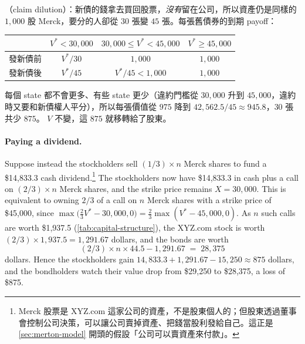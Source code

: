 \begin{remark}
	（claim dilution）：新債的錢拿去買回股票，\emph{沒有}留在公司，所以資產仍是同樣的 $1{,}000$ 股 Merck，要分的人卻從 $30$ 張變 $45$ 張。每張舊債券的到期 payoff：
	\begin{center}
		\begin{tabular}{lccc}
			\toprule
			   & $V^{*}<30{,}000$ & $30{,}000\le V^{*}<45{,}000$ & $V^{*}\ge45{,}000$ \\
			\midrule
			發新債前 & $V^{*}/30$       & $1{,}000$                    & $1{,}000$          \\
			發新債後 & $V^{*}/45$       & $V^{*}/45<1{,}000$           & $1{,}000$          \\
			\bottomrule
		\end{tabular}
	\end{center}
	每個 state 都不會更多、有些 state 更少（違約門檻從 $30{,}000$ 升到 $45{,}000$，違約時又要和新債權人平分），所以每張價值從 $975$ 降到 $42{,}562.5/45\approx945.8$，$30$ 張共少 $875$。
	$V$ 不變，這 $875$ 就移轉給了股東。
\end{remark}
\suppend

\paragraph{Paying a dividend.}
Suppose instead the stockholders sell $(1/3)\times n$ Merck shares to fund a \$14,833.3 cash dividend.\footnote{Merck 股票是 XYZ.com 這家公司的資產，不是股東個人的；但股東透過董事會控制公司決策，可以讓公司賣掉資產、把錢當股利發給自己。這正是 \autoref{sec:merton-model} 開頭的假設「公司可以賣資產來付款」。}
The stockholders now have \$14,833.3 in cash plus a call on $(2/3)\times n$ Merck shares, and the strike price remains $X=30{,}000$.
This is equivalent to owning $2/3$ of a call on $n$ Merck shares with a strike price of \$45,000, since $\max\bigl(\tfrac23V^{*}-30{,}000,0\bigr)=\tfrac23\max(V^{*}-45{,}000,0)$.
As $n$ such calls are worth \$1,937.5 (\autoref{tab:capital-structure}), the XYZ.com stock is worth $(2/3)\times1{,}937.5=1{,}291.67$ dollars, and the bonds are worth
\[
	(2/3)\times n\times44.5-1{,}291.67 \;=\; 28{,}375
\]
dollars.
Hence the stockholders gain $14{,}833.3+1{,}291.67-15{,}250\approx875$ dollars, and the bondholders watch their value drop from \$29,250 to \$28,375, a loss of \$875.

\suppstart
{}

